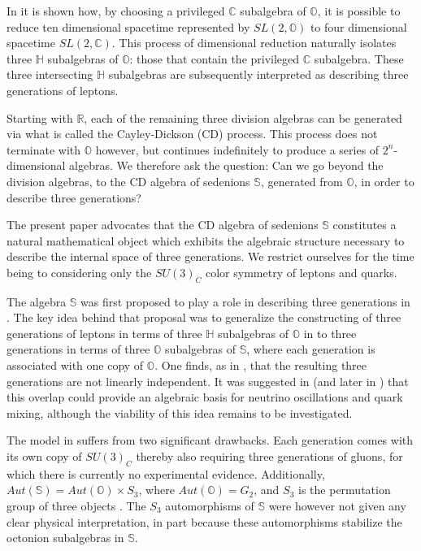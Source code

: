 \documentclass{article}
\newcommand{\bb}[1]{\mathbb{#1}}
\begin{document}
In \cite{manogue1999dimensional} it is shown how, by choosing a privileged $\bb{C}$ subalgebra of $\bb{O}$, it is possible to reduce ten dimensional spacetime represented by $SL(2,\bb{O})$ to four dimensional spacetime $SL(2,\bb{C})$. This process of dimensional reduction naturally isolates three $\bb{H}$ subalgebras of $\bb{O}$: those that contain the privileged $\bb{C}$ subalgebra. These three intersecting $\bb{H}$ subalgebras are subsequently interpreted as describing three generations of leptons.

Starting with $\mathbb{R}$, each of the remaining three division algebras can be generated via what is called the Cayley-Dickson (CD) process. This process does not terminate with $\bb{O}$ however, but continues indefinitely to produce a series of $2^n$-dimensional algebras. We therefore ask the question: Can we go beyond the division algebras, to the CD algebra of sedenions $\bb{S}$, generated from $\bb{O}$, in order to describe three generations?

The present paper advocates that the CD algebra of sedenions $\bb{S}$ constitutes a natural mathematical object which exhibits the algebraic structure necessary to describe the internal space of three generations. We restrict ourselves for the time being to considering only the $SU(3)_C$ color symmetry of leptons and quarks. 

The algebra $\bb{S}$ was first proposed to play a role in describing three generations  in \cite{gillard2019three}. The key idea behind that proposal was to generalize the constructing of three generations of leptons in terms of three $\bb{H}$ subalgebras of $\bb{O}$ in \cite{manogue1999dimensional} to three generations in terms of three $\bb{O}$ subalgebras of $\bb{S}$, where each generation is associated with one copy of $\bb{O}$. One finds, as in \cite{manogue1999dimensional}, that the resulting three generations are not linearly independent. It was suggested in \cite{gillard2019three} (and later in \cite{manogue2022octions}) that this overlap could provide an algebraic basis for neutrino oscillations and quark mixing, although the viability of this idea remains to be investigated.

The model in \cite{gillard2019three} suffers from two significant drawbacks. Each generation comes with its own copy of $SU(3)_C$ thereby also requiring three generations of gluons, for which there is currently no experimental evidence. Additionally, $Aut(\bb{S})=Aut(\bb{O})\times S_3$, where $Aut(\bb{O})=G_2$, and $S_3$ is the permutation group of three objects \cite{schafer1954algebras,brown1967generalized}. The $S_3$ automorphisms of $\bb{S}$ were however not given any clear physical interpretation, in part because these automorphisms stabilize the octonion subalgebras in $\bb{S}$.
\end{document}
